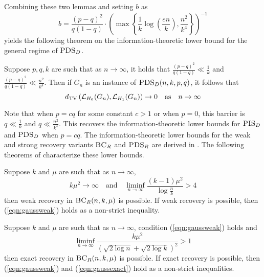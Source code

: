 Combining these two lemmas and setting $b$ as
$$b = \frac{(p - q)^2}{q(1 - q)} \cdot \left( \max \left\{ \frac{1}{k} \log \left( \frac{en}{k} \right), \frac{n^2}{k^4} \right\} \right)^{-1}$$
yields the following theorem on the information-theoretic lower bound for the general regime of $\textsc{PDS}_D$.

\begin{theorem}
Suppose $p, q, k$ are such that as $n \to \infty$, it holds that $\frac{(p - q)^2}{q(1 - q)} \ll \frac{1}{k}$ and $\frac{(p - q)^2}{q(1 - q)} \ll \frac{n^2}{k^4}$. Then if $G_n$ is an instance of $\textsc{PDS}_D(n, k, p, q)$, it follows that
$$d_{\text{TV}}\left( \mathcal{L}_{H_0}(G_n), \mathcal{L}_{H_1}(G_n) \right) \to 0 \quad \text{as} \quad n \to \infty$$
\end{theorem}

Note that when $p = cq$ for some constant $c > 1$ or when $p = 0$, this barrier is $q \ll \frac{1}{k}$ and $q \ll \frac{n^2}{k^4}$. This recovers the information-theoretic lower bounds for $\textsc{PIS}_D$ and $\textsc{PDS}_D$ when $p = cq$. The information-theoretic lower bounds for the weak and strong recovery variants $\textsc{BC}_R$ and $\textsc{PDS}_R$ are derived in \cite{hajek2016information}. The following theorems of \cite{hajek2016information} characterize these lower bounds.

\begin{theorem} \label{thm:infbcrec}
Suppose $k$ and $\mu$ are such that as $n \to \infty$,
\begin{equation} \label{eqn:gaussweak}
k\mu^2 \to \infty \quad \text{and} \quad \liminf_{n \to \infty} \frac{(k-1)\mu^2}{\log \frac{n}{k}} > 4
\end{equation}
then weak recovery in $\textsc{BC}_R(n, k, \mu)$ is possible. If weak recovery is possible, then (\ref{eqn:gaussweak}) holds as a non-strict inequality.
\end{theorem}

\begin{theorem} \label{thm:bicexact}
Suppose $k$ and $\mu$ are such that as $n \to \infty$, condition (\ref{eqn:gaussweak}) holds and
\begin{equation} \label{eqn:gaussexact}
\liminf_{n \to \infty} \frac{k\mu^2}{\left( \sqrt{2 \log n} + \sqrt{2 \log k} \right)^2} > 1
\end{equation}
then exact recovery in $\textsc{BC}_R(n, k, \mu)$ is possible. If exact recovery is possible, then (\ref{eqn:gaussweak}) and (\ref{eqn:gaussexact}) hold as a non-strict inequalities.
\end{theorem}

